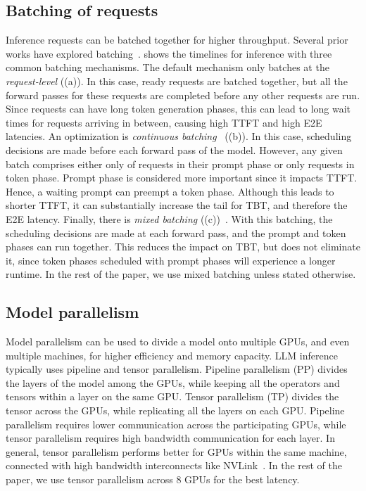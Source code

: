 \subsection{Batching of requests}
Inference requests can be batched together for higher throughput.
Several prior works have explored batching~\cite{yu2022orca,sarathi}.
 shows the timelines for inference with three common batching mechanisms.
The default mechanism only batches at the \emph{request-level} ((a)).
In this case, ready requests are batched together, but all the forward passes for these requests are completed before any other requests are run.
Since requests can have long token generation phases, this can lead to long wait times for requests arriving in between, causing high TTFT and high E2E latencies.
An optimization is \emph{continuous batching}~\cite{yu2022orca} ((b)).
In this case, scheduling decisions are made before each forward pass of the model. However, any given batch comprises either only of requests in their prompt phase or only requests in token phase.
Prompt phase is considered more important since it impacts TTFT.
Hence, a waiting prompt can preempt a token phase.
Although this leads to shorter TTFT, it can substantially increase the tail for TBT, and therefore the E2E latency.
Finally, there is \emph{mixed batching} ((c))~\cite{sarathi}.
With this batching, the scheduling decisions are made at each forward pass, and the prompt and token phases can run together.
This reduces the impact on TBT, but does not eliminate it, since token phases scheduled with prompt phases will experience a longer runtime.
In the rest of the paper, we use mixed batching unless stated otherwise.


\subsection{Model parallelism}
\label{sec:modelparallel}
Model parallelism can be used to divide a model onto multiple GPUs, and even multiple machines, for higher efficiency and memory capacity.
LLM inference typically uses pipeline and tensor parallelism.
Pipeline parallelism (PP) divides the layers of the model among the GPUs, while keeping all the operators and tensors within a layer on the same GPU.
Tensor parallelism (TP) divides the tensor across the GPUs, while replicating all the layers on each GPU.
Pipeline parallelism requires lower communication across the participating GPUs, while tensor parallelism requires high bandwidth communication for each layer. 
In general, tensor parallelism performs better for GPUs within the same machine, connected with high bandwidth interconnects like \eg NVLink~\cite{nvidia_dgx_a100}.
In the rest of the paper, we use tensor parallelism across 8 GPUs for the best latency.


